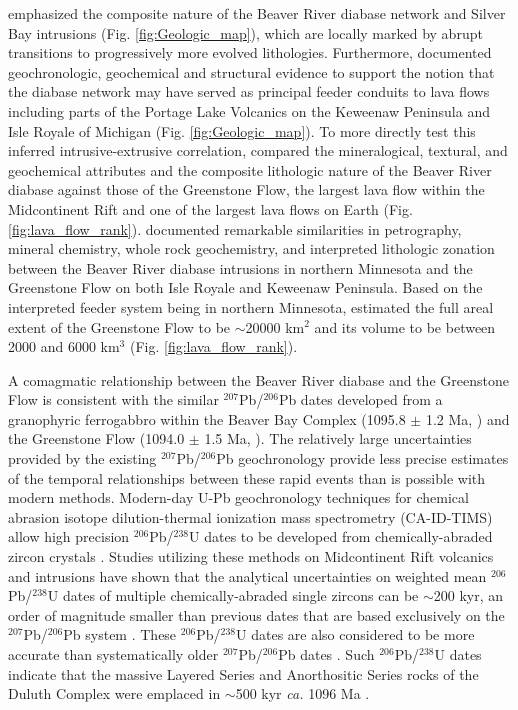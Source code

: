 \documentclass[draft]{agujournal2019}
\begin{document}
 emphasized the composite nature of the Beaver River diabase network and Silver Bay intrusions (Fig. \ref{fig:Geologic_map}), which are locally marked by abrupt transitions to progressively more evolved lithologies. Furthermore,  documented geochronologic, geochemical and structural evidence to support the notion that the diabase network may have served as principal feeder conduits to lava flows including parts of the Portage Lake Volcanics on the Keweenaw Peninsula and Isle Royale of Michigan (Fig. \ref{fig:Geologic_map}). To more directly test this inferred intrusive-extrusive correlation,  compared the mineralogical, textural, and geochemical attributes and the composite lithologic nature of the Beaver River diabase against those of the Greenstone Flow, the largest lava flow within the Midcontinent Rift and one of the largest lava flows on Earth (Fig. \ref{fig:lava_flow_rank}).  documented remarkable similarities in petrography, mineral chemistry, whole rock geochemistry, and interpreted lithologic zonation between the Beaver River diabase intrusions in northern Minnesota and the Greenstone Flow on both Isle Royale and Keweenaw Peninsula. Based on the interpreted feeder system being in northern Minnesota,  estimated the full areal extent of the Greenstone Flow to be $\sim$20000 km$^2$ and its volume to be between 2000 and 6000 km$^3$ (Fig. \ref{fig:lava_flow_rank}). 

A comagmatic relationship between the Beaver River diabase and the Greenstone Flow is consistent with the similar $^{207}$Pb/$^{206}$Pb dates developed from a granophyric ferrogabbro within the Beaver Bay Complex (1095.8 $\pm$ 1.2 Ma, ) and the Greenstone Flow (1094.0 $\pm$ 1.5 Ma, ). The relatively large uncertainties provided by the existing $^{207}$Pb/$^{206}$Pb geochronology provide less precise estimates of the temporal relationships between these rapid events than is possible with modern methods. Modern-day U-Pb geochronology techniques for chemical abrasion isotope dilution-thermal ionization mass spectrometry (CA-ID-TIMS) allow high precision $^{206}$Pb/$^{238}$U dates to be developed from chemically-abraded zircon crystals \cite{Mattinson2005a}. Studies utilizing these methods on Midcontinent Rift volcanics and intrusions have shown that the analytical uncertainties on weighted mean $^{206}$Pb/$^{238}$U dates of multiple chemically-abraded single zircons can be $\sim$200 kyr, an order of magnitude smaller than previous dates that are based exclusively on the $^{207}$Pb/$^{206}$Pb system \cite{Fairchild2017a, Swanson-Hysell2019a, Swanson-Hysell2020a}. These $^{206}$Pb/$^{238}$U dates are also considered to be more accurate than systematically older $^{207}$Pb/$^{206}$Pb dates \cite{Schoene2006a}. Such $^{206}$Pb/$^{238}$U dates indicate that the massive Layered Series and Anorthositic Series rocks of the Duluth Complex were emplaced in $\sim$500 kyr \textit{ca.} 1096 Ma \cite{Swanson-Hysell2020a}.  
\end{document}
